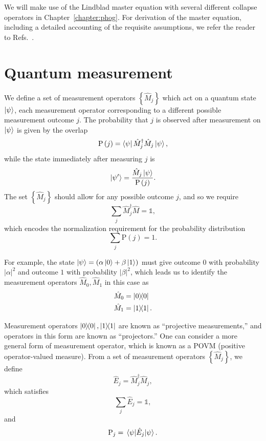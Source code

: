 We will make use of the Lindblad master equation with several different collapse operators in Chapter~\ref{chapter:phog}. For derivation of the master equation, including a detailed accounting of the requisite assumptions, we refer the reader to Refs.~\cite{Breuer2002, Carmichael1999}.



\FloatBarrier
\section{Quantum measurement}
We define a set of measurement operators $\left\{\hat{M}_j\right\}$ which act on a quantum state $\ket{\psi}$, each measurement operator corresponding to a different possible measurement outcome $j$. The probability that $j$ is observed after measurement on $\ket{\psi}$ is given by the overlap
\begin{equation}
\text{P}\left(j\right) = \bra{\psi}\hat{M}^\dagger_j \hat{M}_j\ket{\psi},
\end{equation}
while the state immediately after measuring $j$ is 
\begin{equation}
\ket{\psi^\prime} = \frac{\hat{M}_j \ket{\psi}}{\text{P}\left(j\right)}.
\end{equation}
The set $\left\{\hat{M}_j\right\}$ should allow for any possible outcome $j$, and so we require
\begin{equation}
\sum_j \hat{M}_j^\dagger \hat{M} = \mathds{1},
\end{equation}
which encodes the normalization requirement for the probability distribution
\begin{equation}
\sum_j \text{P}\left(j\right) = 1.
\end{equation}

\noindent For example, the state $\ket{\psi} = \left(\alpha\ket{0}  + \beta\ket{1}\right)$ must give outcome $0$ with probability $\left|\alpha\right|^2$ and outcome $1$ with probability $\left|\beta\right|^2$, which leads us to identify the measurement operators $\hat{M}_0, \hat{M}_1$ in this case as
\begin{align*}
&\hat{M}_0 = \dyad{0} \\
&\hat{M}_1 = \dyad{1}.
\end{align*}

\noindent Measurement operators $\dyad{0}, \dyad{1}$ are known as ``projective measurements,'' and operators in this form are known as ``projectors.'' One can consider a more general form of measurement operator, which is known as a POVM (positive operator-valued measure). From a set of measurement operators $\left\{\hat{M}_j\right\}$, we define
\begin{equation}
\hat{E}_j = \hat{M}^\dagger_j \hat{M}_j,
\end{equation}
which satisfies
\begin{equation}
\sum_j \hat{E}_j = \mathds{1},
\end{equation}
and
\begin{equation}
\text{P}_j = \ev{\hat{E}_j}{\psi}.
\end{equation}

